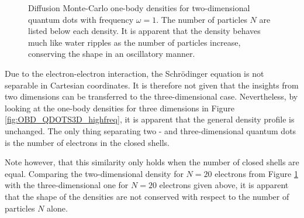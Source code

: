 \begin{figure}
\begin{center}
  \caption{Diffusion Monte-Carlo one-body densities for two-dimensional quantum dots with frequency $\omega=1$. The number of particles $N$ are listed below each density. It is apparent that the density behaves much like water ripples as the number of particles increase, conserving the shape in an oscillatory manner.}
  \label{fig:OBD_DMC_QDOTS_w1} 
 \end{center}
\end{figure}

\clearpage


Due to the electron-electron interaction, the Schrödinger equation is not separable in Cartesian coordinates. It is therefore not given that the insights from two dimensions can be transferred to the three-dimensional case. Nevertheless, by looking at the one-body densities for three dimensions in Figure \ref{fig:OBD_QDOTS3D_highfreq}, it is apparent that the general density profile is unchanged. The only thing separating two - and three-dimensional quantum dots is the number of electrons in the closed shells.

Note however, that this similarity only holds when the number of closed shells are equal. Comparing the two-dimensional density for $N=20$ electrons from Figure \ref{fig:OBD_DMC_QDOTS_w1} with the three-dimensional one for $N=20$ electrons given above, it is apparent that the shape of the densities are not conserved with respect to the number of particles $N$ alone.

